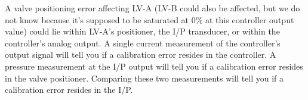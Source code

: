 \vskip 10pt

A valve positioning error affecting LV-A (LV-B could also be affected, but we do not know because it's supposed to be saturated at 0\% at this controller output value) could lie within LV-A's positioner, the I/P transducer, or within the controller's analog output.  A single current measurement of the controller's output signal will tell you if a calibration error resides in the controller.  A pressure measurement at the I/P output will tell you if a calibration error resides in the valve positioner.  Comparing these two measurements will tell you if a calibration error resides in the I/P.



